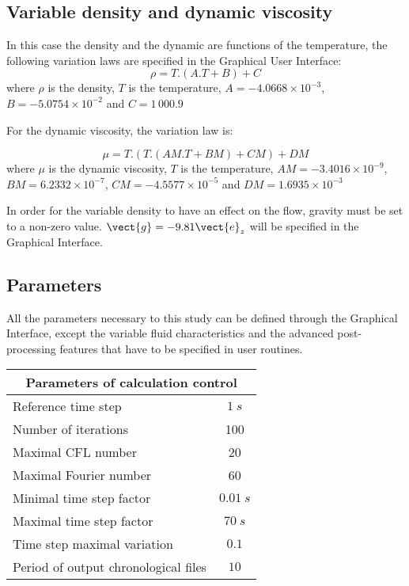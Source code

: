         \subsection{Variable density and dynamic viscosity}

In this case the density and the dynamic are functions of the temperature, the following variation laws are specified in the Graphical User Interface:
\begin{equation}
\rho = T.(A.T + B) + C
\end{equation}
where $\rho$ is the density, $T$ is the temperature, $A = -4.0668\times10^{-3}$,
$B =-5.0754\times 10^{-2}$ and $C = 1\,000.9$


For the dynamic viscosity, the variation law is:

\begin{equation}
\mu = T.(T.(AM.T + BM) + CM) + DM
\end{equation}
where $\mu$ is the dynamic viscosity, $T$ is the temperature,
$AM=-3.4016\times 10^{-9}$, $BM = 6.2332\times 10^{-7}$,
$CM = -4.5577\times 10^{-5}$ and $DM = 1.6935\times 10^{-3}$

In order for the variable density to have an effect on the flow, gravity must be
set to a non-zero value. $\vect{g} = -9.81 \vect{e}_z$ will be specified in the
Graphical Interface.


        \subsection{Parameters}
All the parameters necessary to this study can be defined through the Graphical
Interface, except the variable fluid characteristics and the advanced
post-processing features that have to be specified in user routines.

\begin{center}
\begin{tabular}{|l|c|}
\hline
\multicolumn{2}{|c|}{Parameters of calculation control} \\
\hline
Reference time step & $1\ s $ \\
\hline
Number of iterations & 100 \\
\hline
Maximal CFL number & 20 \\
\hline
Maximal Fourier number & 60 \\
\hline
Minimal time step factor & $0.01\ s$ \\
\hline
Maximal time step factor & $70\ s$ \\
\hline
Time step maximal variation & $0.1$ \\
\hline
Period of output chronological files & $10$ \\
\hline
\end{tabular}\\
\end{center}

